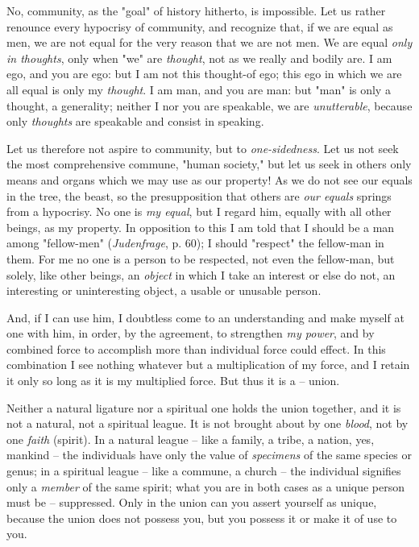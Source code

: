 No, community, as the "{}goal"{} of history hitherto, is impossible. Let us 
rather renounce every hypocrisy of community, and recognize that, if we are 
equal as men, we are not equal for the very reason that we are not men. We are 
equal \textit{only in thoughts}, only when "{}we"{} are \textit{thought}, not 
as we really and bodily are. I am ego, and you are ego: but I am not this 
thought-of ego; this ego in which we are all equal is only my 
\textit{thought}. I am man, and you are man: but "{}man"{} is only a thought, 
a generality; neither I nor you are speakable, we are \textit{unutterable}, 
because only \textit{thoughts} are speakable and consist in speaking.

Let us therefore not aspire to community, but to \textit{one-sidedness}. Let 
us not seek the most comprehensive commune, "{}human society,"{} but let us 
seek in others only means and organs which we may use as our property! As we 
do not see our equals in the tree, the beast, so the presupposition that 
others are \textit{our equals} springs from a hypocrisy. No one is \textit{my 
equal}, but I regard him, equally with all other beings, as my property. In 
opposition to this I am told that I should be a man among "{}fellow-men"{} 
(\textit{Judenfrage}, p. 60); I should "{}respect"{} the fellow-man in them. 
For me no one is a person to be respected, not even the fellow-man, but 
solely, like other beings, an \textit{object} in which I take an interest or 
else do not, an interesting or uninteresting object, a usable or unusable 
person.

And, if I can use him, I doubtless come to an understanding and make myself at 
one with him, in order, by the agreement, to strengthen \textit{my power}, and 
by combined force to accomplish more than individual force could effect. In 
this combination I see nothing whatever but a multiplication of my force, and 
I retain it only so long as it is my multiplied force. But thus it is a -- 
union.

Neither a natural ligature nor a spiritual one holds the union together, and 
it is not a natural, not a spiritual league. It is not brought about by one 
\textit{blood}, not by one \textit{faith} (spirit). In a natural league -- 
like a family, a tribe, a nation, yes, mankind -- the individuals have only 
the value of \textit{specimens} of the same species or genus; in a spiritual 
league -- like a commune, a church -- the individual signifies only a 
\textit{member} of the same spirit; what you are in both cases as a unique 
person must be -- suppressed. Only in the union can you assert yourself as 
unique, because the union does not possess you, but you possess it or make it 
of use to you.

